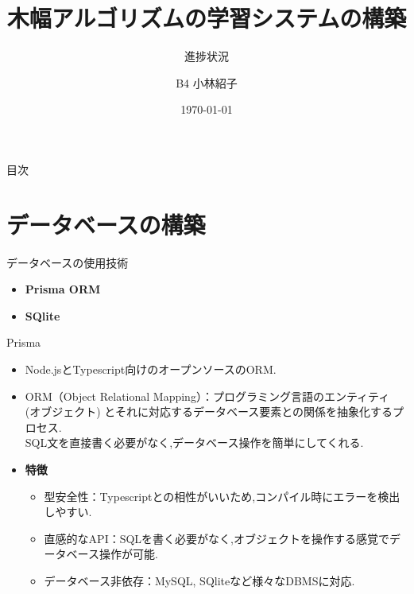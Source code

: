 \documentclass[aspectratio=169]{beamer}
\begin{document}
\title{\Large 木幅アルゴリズムの学習システムの構築}
\subtitle{進捗状況} 
\author{\small B4 小林紹子} %
\date{\small\today} %

\begin{frame}
    \titlepage
\end{frame}

\begin{frame}{目次}
    \tableofcontents
\end{frame}

\section{データベースの構築}

\begin{frame}{データベースの使用技術}
    \begin{itemize}
        \setlength{\parskip}{1.5em}
        \item \textbf{Prisma ORM}
        \item \textbf{SQlite}
    \end{itemize}
\end{frame}

\begin{frame}{Prisma}
    \begin{itemize}
        \setlength{\parskip}{1.5em}
        \item Node.jsとTypescript向けのオープンソースのORM\cite{prisma}.
        \item ORM（Object Relational Mapping）：プログラミング言語のエンティティ (オブジェクト) とそれに対応するデータベース要素との関係を抽象化するプロセス\cite{orm}.\\
        \rightarrowfill SQL文を直接書く必要がなく,データベース操作を簡単にしてくれる.
        \item \textbf{特徴}
        \begin{itemize}
            \setlength{\parskip}{1.5em}
            \item 型安全性：Typescriptとの相性がいいため,コンパイル時にエラーを検出しやすい.
            \item 直感的なAPI：SQLを書く必要がなく,オブジェクトを操作する感覚でデータベース操作が可能.
            \item データベース非依存：MySQL, SQliteなど様々なDBMSに対応.
        \end{itemize}
    \end{itemize}
\end{frame}
\end{document}
